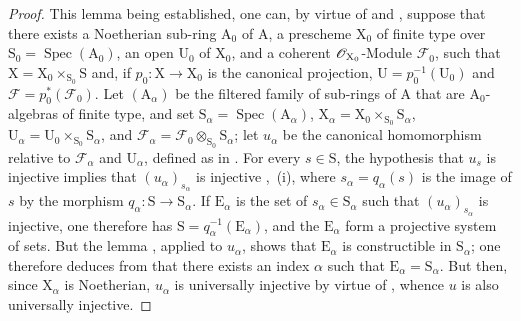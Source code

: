 \begin{proof}
This lemma being established, one can, by virtue of  and , suppose that there exists a Noetherian sub-ring $\mathrm{A}_0$ of $\mathrm{A}$, a prescheme $\mathrm{X}_0$ of finite type over $\mathrm{S}_0=\operatorname{Spec}(\mathrm{A}_0)$, an open $\mathrm{U}_0$ of $\mathrm{X}_0$, and a coherent $\mathscr{O}_{\mathrm{X}_0}$-Module $\mathscr{F}_0$, such that $\mathrm{X}=\mathrm{X}_0\times_{\mathrm{S}_0}\mathrm{S}$ and, if $p_0:\mathrm{X}\to\mathrm{X}_0$ is the canonical projection, $\mathrm{U}=p_0^{-1}(\mathrm{U}_0)$ and $\mathscr{F}=p_0^*(\mathscr{F}_0)$.
Let $(\mathrm{A}_\alpha)$ be the filtered family of sub-rings of $\mathrm{A}$ that are $\mathrm{A}_0$-algebras of finite type, and set $\mathrm{S}_\alpha=\operatorname{Spec}(\mathrm{A}_\alpha)$, $\mathrm{X}_\alpha=\mathrm{X}_0\times_{\mathrm{S}_0}\mathrm{S}_\alpha$, $\mathrm{U}_\alpha=\mathrm{U}_0\times_{\mathrm{S}_0}\mathrm{S}_\alpha$, and $\mathscr{F}_\alpha=\mathscr{F}_0\otimes_{\mathrm{S}_0}\mathrm{S}_\alpha$; let $u_\alpha$ be the canonical homomorphism relative to $\mathscr{F}_\alpha$ and $\mathrm{U}_\alpha$, defined as in .
For every $s\in\mathrm{S}$, the hypothesis that $u_s$ is injective implies that $(u_\alpha)_{s_\alpha}$ is injective ,~(i), where $s_\alpha=q_\alpha(s)$ is the image of $s$ by the morphism $q_\alpha:\mathrm{S}\to\mathrm{S}_\alpha$.
If $\mathrm{E}_\alpha$ is the set of $s_\alpha\in\mathrm{S}_\alpha$ such that $(u_\alpha)_{s_\alpha}$ is injective, one therefore has $\mathrm{S}=q_\alpha^{-1}(\mathrm{E}_\alpha)$, and the $\mathrm{E}_\alpha$ form a projective system of sets.
But the lemma , applied to $u_\alpha$, shows that $\mathrm{E}_\alpha$ is constructible in $\mathrm{S}_\alpha$; one therefore deduces from  that there exists an index $\alpha$ such that $\mathrm{E}_\alpha=\mathrm{S}_\alpha$.
But then, since $\mathrm{X}_\alpha$ is Noetherian, $u_\alpha$ is universally injective by virtue of , whence $u$ is also universally injective.
\medskip


\end{proof}
